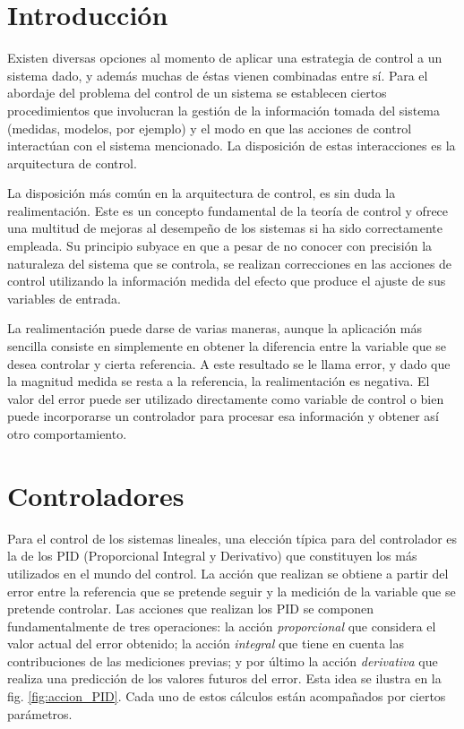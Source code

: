 \section{Introducción}
Existen diversas opciones al momento de aplicar una estrategia de control a un sistema dado, y además muchas de éstas vienen combinadas entre sí. Para el
abordaje del problema del control de un sistema se establecen ciertos procedimientos que involucran la gestión de la información tomada del sistema (medidas,
modelos, por ejemplo) y el modo en que las acciones de control interactúan con el sistema mencionado. La disposición de estas interacciones es la arquitectura
de control.

La disposición más común en la arquitectura de control, es sin duda la realimentación. Este es un concepto fundamental de la teoría de control y ofrece una multitud
de mejoras al desempeño de los sistemas si ha sido correctamente empleada. Su principio subyace en que a pesar de no conocer con precisión la naturaleza del 
sistema que se controla, se realizan correcciones en las acciones de control utilizando la información medida del efecto que produce el ajuste de sus variables de entrada.

La realimentación puede darse de varias maneras, aunque la aplicación más sencilla consiste en simplemente en obtener la diferencia entre la variable que se 
desea controlar y cierta referencia. A este resultado se le llama error, y dado que la magnitud medida se resta a la referencia, la realimentación es negativa.
El valor del error puede ser utilizado directamente como variable de control o bien puede incorporarse un controlador para procesar esa información y obtener
así otro comportamiento.

\section{Controladores}

Para el control de los sistemas lineales, una elección típica para del controlador es la de los PID (Proporcional Integral y Derivativo) que constituyen los 
más utilizados en el mundo del control. La acción que realizan se obtiene a partir del error entre la referencia que se pretende seguir y la medición
de la variable que se pretende controlar. Las acciones que realizan los PID se componen fundamentalmente de tres operaciones: la acción \emph{proporcional} que
considera el valor actual del error obtenido; la acción \emph{integral} que tiene en cuenta las contribuciones de las mediciones previas; y por último
la acción \emph{derivativa} que realiza una predicción de los valores futuros del error. Esta idea se ilustra en la fig. \ref{fig:accion_PID}. Cada uno
de estos cálculos están acompañados por ciertos parámetros.

